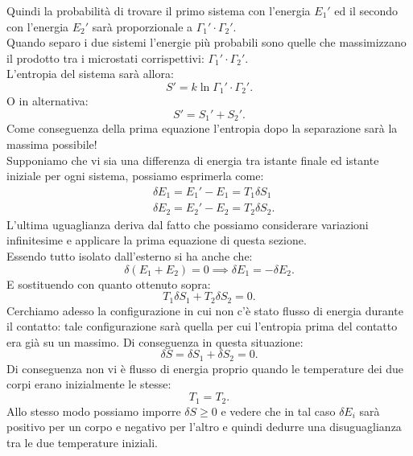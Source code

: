 Quindi la probabilità di trovare il primo sistema con l'energia $E_1'$ ed il secondo con l'energia $E_2'$ sarà proporzionale a $\Gamma_1'\cdot \Gamma_2'$.\\
Quando separo i due sistemi l'energie più probabili sono quelle che massimizzano il prodotto tra i microstati corrispettivi: $\Gamma_1'\cdot \Gamma_2'$.\\
L'entropia del sistema sarà allora:
\[
	S' = k \ln \Gamma_1'\cdot \Gamma_2'
.\] 
O in alternativa:
\[
	S' = S_1' + S_2'
.\] 
Come conseguenza della prima equazione l'entropia dopo la separazione sarà la massima possibile!\\
Supponiamo che vi sia una differenza di energia tra istante finale ed istante iniziale per ogni sistema, possiamo esprimerla come:
\begin{align}
	&\delta E_1= E_1'-E_1 = T_1 \delta S_1\\
	&\delta E_2 = E_2' - E_2 = T_2 \delta S_2
.\end{align}
L'ultima uguaglianza deriva dal fatto che possiamo considerare variazioni infinitesime e applicare la prima equazione di questa sezione.\\
Essendo tutto isolato dall'esterno si ha anche che:
\[
	\delta \left( E_1 + E_2 \right) = 0 \implies \delta E_1 = - \delta E_2
.\] 
E sostituendo con quanto ottenuto sopra:
\[
	T_1 \delta S_1 + T_2 \delta S_2 = 0
.\] 
Cerchiamo adesso la configurazione in cui non c'è stato flusso di energia durante il contatto: tale configurazione sarà quella per cui l'entropia prima del contatto era già su un massimo. Di conseguenza in questa situazione:
\[
	\delta S = \delta S_1 + \delta S_2 = 0
.\] 
Di conseguenza non vi è flusso di energia proprio quando le temperature dei due corpi erano inizialmente le stesse:
\[
	T_1 = T_2
.\] 
Allo stesso modo possiamo imporre $\delta S\ge 0$ e vedere che in tal caso $\delta E_{i}$ sarà positivo per un corpo e negativo per l'altro e quindi dedurre una disuguaglianza tra le due temperature iniziali.

